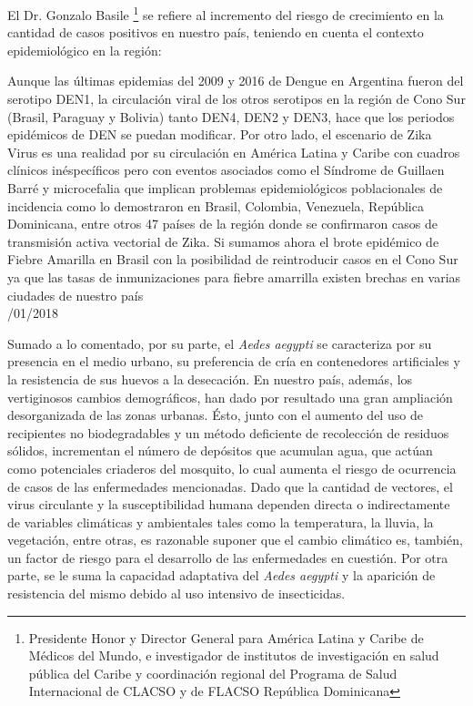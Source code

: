   \par El Dr. Gonzalo Basile \footnote{Presidente Honor y Director General para
                   América Latina y Caribe de Médicos del Mundo, e investigador de institutos de
                   investigación en salud pública del Caribe y coordinación regional del Programa
                   de Salud Internacional de CLACSO y de FLACSO República Dominicana}
       se refiere al incremento del riesgo de crecimiento
       en la cantidad de casos positivos en nuestro país, teniendo en cuenta
       el contexto epidemiológico en la región:
    \begin{framed}

      Aunque las últimas epidemias del 2009 y 2016 de Dengue en Argentina fueron del
      serotipo DEN1, la circulación viral de los otros serotipos en la región de
      Cono Sur (Brasil, Paraguay y Bolivia) tanto DEN4, DEN2 y DEN3, hace que los
      periodos epidémicos de DEN se puedan modificar. Por otro lado, el escenario de
      Zika Virus es una realidad por su circulación en América Latina y Caribe con
      cuadros clínicos inéspecíficos pero con eventos asociados como el Síndrome de
      Guillaen Barré y microcefalia que implican problemas epidemiológicos
      poblacionales de incidencia como lo demostraron en Brasil, Colombia, Venezuela,
      República Dominicana, entre otros 47 países de la región donde se confirmaron
      casos de transmisión activa vectorial de Zika.
      Si sumamos ahora el brote epidémico de Fiebre Amarilla en Brasil con la
      posibilidad de reintroducir casos en el Cono Sur ya que las tasas de
      inmunizaciones para fiebre amarrilla existen brechas en varias ciudades de nuestro país \\

     /01/2018
    \end{framed}



  \par Sumado a lo comentado, por su parte, el \textit{Aedes aegypti} se
    caracteriza por su presencia en el medio urbano, su preferencia
    de cría en contenedores artificiales \cite{cont_artificiales} y la
    resistencia de sus huevos a la
    desecación. En nuestro país, además, los vertiginosos cambios demográficos, han dado
    por resultado una gran ampliación desorganizada de las zonas urbanas. Ésto, junto
    con el aumento del uso de recipientes no biodegradables y un método deficiente
    de recolección de residuos sólidos, incrementan el número de depósitos que
    acumulan agua, que actúan como potenciales criaderos del mosquito, lo cual aumenta el
    riesgo de ocurrencia de casos de las enfermedades mencionadas.
    Dado que la cantidad de vectores, el virus circulante y la susceptibilidad
    humana dependen directa o indirectamente de variables climáticas y ambientales
    tales como la temperatura, la lluvia, la vegetación, entre otras, es razonable
    suponer que el cambio climático es, también, un factor de riesgo para el desarrollo
    de las enfermedades en cuestión. Por otra parte, se le suma la capacidad adaptativa del
    \textit{Aedes aegypti} y la aparición de resistencia del mismo debido al uso intensivo de
    insecticidas.

